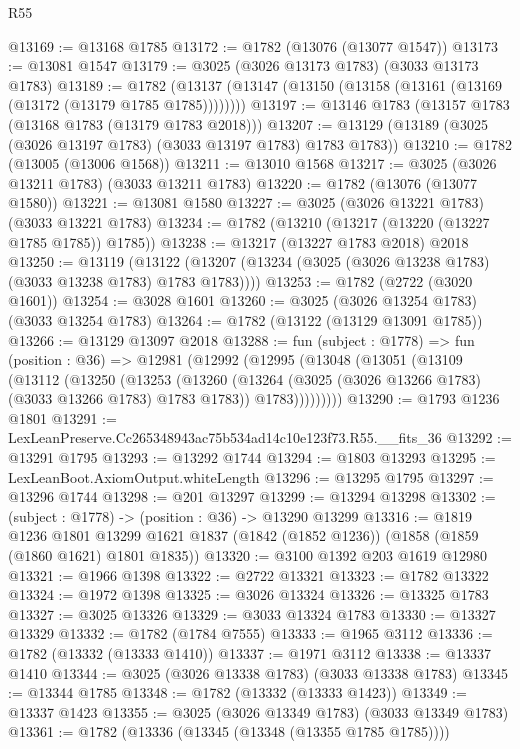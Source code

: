 \begin{lexlean}{R55}
\begin{coremodule}
@13169 := @13168 @1785
@13172 := @1782 (@13076 (@13077 @1547))
@13173 := @13081 @1547
@13179 := @3025 (@3026 @13173 @1783) (@3033 @13173 @1783)
@13189 := @1782 (@13137 (@13147 (@13150 (@13158 (@13161 (@13169 (@13172 (@13179 @1785 @1785))))))))
@13197 := @13146 @1783 (@13157 @1783 (@13168 @1783 (@13179 @1783 @2018)))
@13207 := @13129 (@13189 (@3025 (@3026 @13197 @1783) (@3033 @13197 @1783) @1783 @1783))
@13210 := @1782 (@13005 (@13006 @1568))
@13211 := @13010 @1568
@13217 := @3025 (@3026 @13211 @1783) (@3033 @13211 @1783)
@13220 := @1782 (@13076 (@13077 @1580))
@13221 := @13081 @1580
@13227 := @3025 (@3026 @13221 @1783) (@3033 @13221 @1783)
@13234 := @1782 (@13210 (@13217 (@13220 (@13227 @1785 @1785)) @1785))
@13238 := @13217 (@13227 @1783 @2018) @2018
@13250 := @13119
    (@13122 (@13207 (@13234 (@3025 (@3026 @13238 @1783) (@3033 @13238 @1783) @1783 @1783))))
@13253 := @1782 (@2722 (@3020 @1601))
@13254 := @3028 @1601
@13260 := @3025 (@3026 @13254 @1783) (@3033 @13254 @1783)
@13264 := @1782 (@13122 (@13129 @13091 @1785))
@13266 := @13129 @13097 @2018
@13288 := fun (subject : @1778) =>
  fun (position : @36) =>
  @12981
    (@12992
      (@12995
        (@13048
          (@13051
            (@13109
              (@13112
                (@13250
                  (@13253
                    (@13260
                      (@13264 (@3025 (@3026 @13266 @1783) (@3033 @13266 @1783) @1783 @1783))
                      @1783)))))))))
@13290 := @1793 @1236 @1801
@13291 := LexLeanPreserve.Cc265348943ac75b534ad14c10e123f73.R55.__fits_36
@13292 := @13291 @1795
@13293 := @13292 @1744
@13294 := @1803 @13293
@13295 := LexLeanBoot.AxiomOutput.whiteLength
@13296 := @13295 @1795
@13297 := @13296 @1744
@13298 := @201 @13297
@13299 := @13294 @13298
@13302 := (subject : @1778) -> (position : @36) -> @13290 @13299
@13316 := @1819
    @1236
    @1801
    @13299
    @1621
    @1837
    (@1842 (@1852 @1236))
    (@1858 (@1859 (@1860 @1621) @1801 @1835))
@13320 := @3100 @1392 @203 @1619 @12980
@13321 := @1966 @1398
@13322 := @2722 @13321
@13323 := @1782 @13322
@13324 := @1972 @1398
@13325 := @3026 @13324
@13326 := @13325 @1783
@13327 := @3025 @13326
@13329 := @3033 @13324 @1783
@13330 := @13327 @13329
@13332 := @1782 (@1784 @7555)
@13333 := @1965 @3112
@13336 := @1782 (@13332 (@13333 @1410))
@13337 := @1971 @3112
@13338 := @13337 @1410
@13344 := @3025 (@3026 @13338 @1783) (@3033 @13338 @1783)
@13345 := @13344 @1785
@13348 := @1782 (@13332 (@13333 @1423))
@13349 := @13337 @1423
@13355 := @3025 (@3026 @13349 @1783) (@3033 @13349 @1783)
@13361 := @1782 (@13336 (@13345 (@13348 (@13355 @1785 @1785))))

\end{coremodule}
\end{lexlean}
